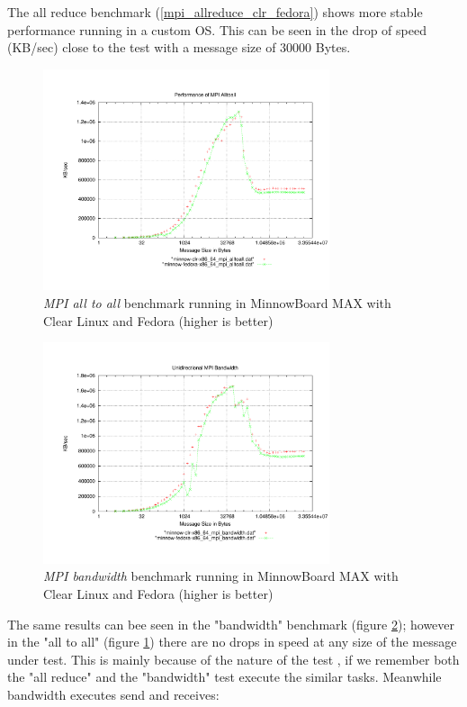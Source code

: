 The all reduce benchmark (\ref{mpi_allreduce_clr_fedora}) shows more stable
performance running in a custom OS.  This can be seen in the drop of speed
(KB/sec) close to the test with a message size of 30000 Bytes. 

\begin{figure}[H]
\centering
\includegraphics[width=0.75\textwidth]{images/mpbench_clr_experiments/mpi_alltoall.pdf}
\caption{\textit{MPI all to all} benchmark running in MinnowBoard MAX with Clear Linux and
Fedora (higher is better)}
\label{mpi_alltoall_clr_fedora}
\end{figure}


\begin{figure}[H]
\centering
\includegraphics[width=0.75\textwidth]{images/mpbench_clr_experiments/mpi_bandwidth.pdf}
\caption{\textit{MPI bandwidth} benchmark running in MinnowBoard MAX with Clear Linux and
Fedora (higher is better)}
\label{mpi_bandwidth_clr_fedora}
\end{figure}

The same results can bee seen in the "bandwidth" benchmark (figure
\ref{mpi_bandwidth_clr_fedora}); however in the "all to all" (figure
\ref{mpi_alltoall_clr_fedora}) there are no drops in speed at any size of the
message under test.  This is mainly because of the nature of the test , if we
remember both the "all reduce" and the "bandwidth" test execute the similar
tasks. Meanwhile bandwidth executes send and receives: 

